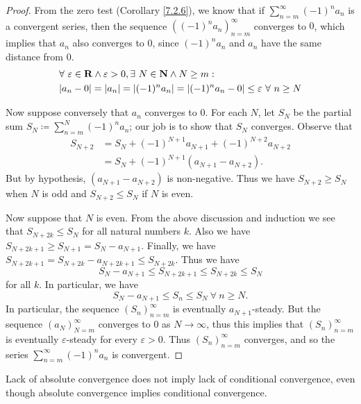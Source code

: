 \begin{proof}
From the zero test (Corollary \ref{7.2.6}), we know that if \(\sum_{n = m}^\infty (-1)^n a_n\) is a convergent series, then the sequence \(((-1)^n a_n)_{n = m}^\infty\) converges to \(0\), which implies that \(a_n\) also converges to \(0\), since \((-1)^n a_n\) and \(a_n\) have the same distance from \(0\).
\begin{align*}
& \forall\ \varepsilon \in \mathbf{R} \land \varepsilon > 0, \exists\ N \in \mathbf{N} \land N \geq m : \\
& \abs*{a_n - 0} = \abs*{a_n} = \abs*{(-1)^n a_n} = \abs*{(-1)^n a_n - 0} \leq \varepsilon \ \forall\ n \geq N
\end{align*}

Now suppose conversely that \(a_n\) converges to \(0\).
For each \(N\), let \(S_N\) be the partial sum \(S_N \coloneqq \sum_{n = m}^N (-1)^n a_n\);
our job is to show that \(S_N\) converges.
Observe that
\begin{align*}
S_{N + 2} &= S_N + (-1)^{N + 1} a_{N + 1} + (-1)^{N + 2} a_{N + 2} \\
&= S_N + (-1)^{N + 1} (a_{N + 1} - a_{N + 2}).
\end{align*}
But by hypothesis, \((a_{N + 1} - a_{N + 2})\) is non-negative.
Thus we have \(S_{N + 2} \geq S_N\) when \(N\) is odd and \(S_{N + 2} \leq S_N\) if \(N\) is even.

Now suppose that \(N\) is even.
From the above discussion and induction we see that \(S_{N + 2k} \leq S_N\) for all natural numbers \(k\).
Also we have \(S_{N + 2k + 1} \geq S_{N + 1} = S_N - a_{N + 1}\).
Finally, we have \(S_{N + 2k + 1} = S_{N + 2k} - a_{N + 2k + 1} \leq S_{N + 2k}\).
Thus we have
\[
    S_N - a_{N + 1} \leq S_{N + 2k + 1} \leq S_{N + 2k} \leq S_N
\]
for all \(k\).
In particular, we have
\[
    S_N - a_{N + 1} \leq S_n \leq S_N \ \forall\ n \geq N.
\]
In particular, the sequence \((S_n)_{n = m}^\infty\) is eventually \(a_{N + 1}\)-steady.
But the sequence \((a_N)_{N = m}^\infty\) converges to \(0\) as \(N \to \infty\), thus this implies that \((S_n)_{n = m}^\infty\) is eventually \(\varepsilon\)-steady for every \(\varepsilon > 0\).
Thus \((S_n)_{n = m}^\infty\) converges, and so the series \(\sum_{n = m}^\infty (-1)^n a_n\) is convergent.
\end{proof}

\begin{note}
Lack of absolute convergence does not imply lack of conditional convergence, even though absolute convergence implies conditional convergence.
\end{note}

